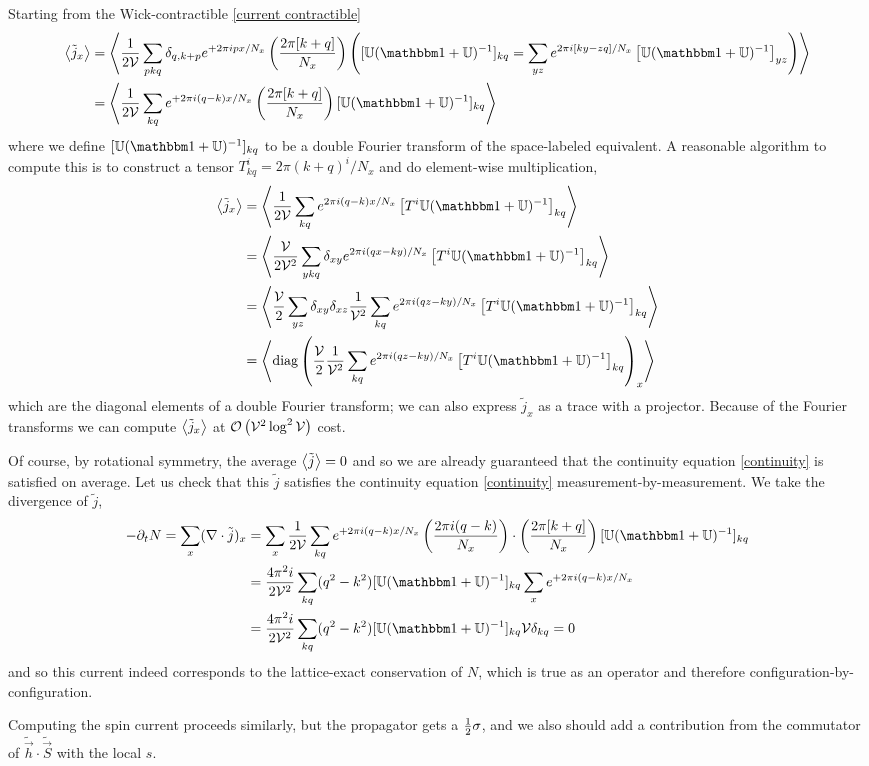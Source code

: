 Starting from the Wick-contractible \eqref{current contractible}
\begin{align}
	\expectation{\tilde{j}_x}
	&=
	\expectation{
		\oneover{2\Volume} \sum_{pkq} \delta_{q,k+p} e^{+2\pi i px / N_x} \left(\frac{2\pi [ k+q ]}{N_x}\right)
		\left( [\UU (\one+\UU)\inverse]_{kq} = \sum_{yz} e^{2\pi i [ ky - zq ] / N_x}
		\left[\UU (\one+\UU)\inverse\right]_{yz}
		\right)
	}
	\nonumber\\
	&=
	\expectation{
		\oneover{2\Volume} \sum_{kq} e^{+2\pi i (q-k) x / N_x} \left(\frac{2\pi [ k+q ]}{N_x}\right)
		 [\UU (\one+\UU)\inverse]_{kq}
	}
\end{align}
where we define $[\UU (\one+\UU)\inverse]_{kq}$ to be a double Fourier transform of the space-labeled equivalent.
A reasonable algorithm to compute this is to construct a tensor $T_{kq}^i = 2\pi(k+q)^i/N_x$ and do element-wise multiplication,
\begin{align}
	\expectation{\tilde{j}_x}
	&=
	\expectation{
		\frac{1}{2\Volume} \sum_{kq} e^{2\pi i(q-k) x / N_x} \left[ T^i \UU (\one+\UU)\inverse\right]_{kq}
	}
	\nonumber\\
	&=
	\expectation{
		\frac{\Volume}{2\Volume^2} \sum_{ykq} \delta_{xy} e^{2\pi i(qx-ky) / N_x} \left[ T^i \UU (\one+\UU)\inverse\right]_{kq}
	}
	\nonumber\\
	&=
	\expectation{
		\frac{\Volume}{2} \sum_{yz} \delta_{xy} \delta_{xz} \oneover{\Volume^2}\sum_{kq} e^{2\pi i(qz-ky) / N_x} \left[ T^i \UU (\one+\UU)\inverse\right]_{kq}
	}
	\nonumber\\
	&=
	\expectation{
		\diag{
			\frac{\Volume}{2} \oneover{\Volume^2}\sum_{kq} e^{2\pi i(qz-ky) / N_x} \left[ T^i \UU (\one+\UU)\inverse\right]_{kq}
		}_x
	}
\end{align}
which are the diagonal elements of a double Fourier transform; we can also express $\tilde{j}_x$ as a trace with a projector.
Because of the Fourier transforms we can compute $\left\langle \tilde{j}_x \right\rangle$ at $\mathcal{O}\left(\mathcal{V}^2 \log^2 \mathcal{V}\right)$ cost.

Of course, by rotational symmetry, the average $\left\langle \tilde{j} \right\rangle=0$ and so we are already guaranteed that the continuity equation \eqref{continuity} is satisfied on average.
Let us check that this $\tilde{j}$ satisfies the continuity equation \eqref{continuity} measurement-by-measurement.
We take the divergence of $\tilde{j}$,
\begin{align}
	-\partial_t N = \sum_x (\grad\cdot \tilde{j})_x
	&=
	\sum_x \oneover{2\Volume} \sum_{kq} e^{+2\pi i (q-k) x / N_x} \left(\frac{2\pi i(q-k)}{N_x}\right) \cdot \left(\frac{2\pi [ k+q ]}{N_x}\right)
		[\UU (\one+\UU)\inverse]_{kq}
	\nonumber\\
	&=
	\frac{4\pi^2i}{2\Volume^2} \sum_{kq}  (q^2-k^2)
		[\UU (\one+\UU)\inverse]_{kq} \sum_x e^{+2\pi i (q-k) x / N_x}
	\nonumber\\
	&=
	\frac{4\pi^2i}{2\Volume^2} \sum_{kq}  (q^2-k^2)
		[\UU (\one+\UU)\inverse]_{kq} \Volume \delta_{kq} = 0
\end{align}
and so this current indeed corresponds to the lattice-exact conservation of $N$, which is true as an operator and therefore configuration-by-configuration.

Computing the spin current proceeds similarly, but the propagator gets a $\frac{1}{2} \sigma$, and we also should add a contribution from the commutator of $\tilde{\vec{h}}\cdot\tilde{\vec{S}}$ with the local $s$.
